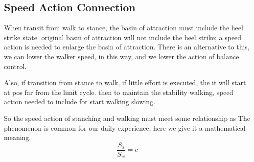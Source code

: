 \subsection{Speed Action Connection}
When transit from walk to stance, the basin of attraction must include the heel strike state.
original basin of attraction will not include the heel strike; a speed action is needed to enlarge the basin of attraction.
There is an alternative to this, we can lower the walker speed, in this way, and we lower the action of balance control.

Also, if transition from stance to walk, if little effort is executed, the it will start at pos far from the limit cycle.
then to maintain the stability walking, speed action needed to include for start walking slowing.

So the speed action of stanching and walking must meet some relationship as
The phenomenon is common for our daily experience; here we give it a mathematical meaning.
\[
\frac{S_s}{S_w}=c
\]

























